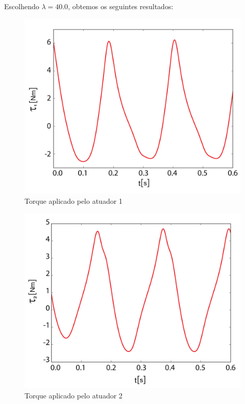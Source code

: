 \documentclass[]{politex}
\begin{document}
Escolhendo $\lambda = 40.0$, obtemos os seguintes resultados:

\begin{multicols}{2}
\begin{figure}[H]
	\centering
	\includegraphics[scale=0.31]{../figures/Torque13.pdf}  
	\caption{Torque aplicado pelo atuador 1}
	\label{fig:Torque13}
\end{figure}

\begin{figure}[H]
	\centering
	\includegraphics[scale=0.31]{../figures/Torque23.pdf}  
	\caption{Torque aplicado pelo atuador 2}
	\label{fig:Torque23}
\end{figure}
\end{multicols}
\end{document}
